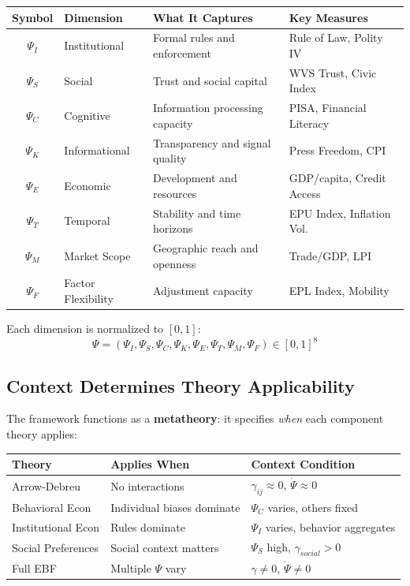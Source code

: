 \begin{center}
\renewcommand{\arraystretch}{1.3}
\begin{tabular}{@{}clll@{}}
\toprule
\textbf{Symbol} & \textbf{Dimension} & \textbf{What It Captures} & \textbf{Key Measures} \\
\midrule
$\Psi_I$ & Institutional & Formal rules and enforcement & Rule of Law, Polity IV \\
$\Psi_S$ & Social & Trust and social capital & WVS Trust, Civic Index \\
$\Psi_C$ & Cognitive & Information processing capacity & PISA, Financial Literacy \\
$\Psi_K$ & Informational & Transparency and signal quality & Press Freedom, CPI \\
$\Psi_E$ & Economic & Development and resources & GDP/capita, Credit Access \\
$\Psi_T$ & Temporal & Stability and time horizons & EPU Index, Inflation Vol. \\
$\Psi_M$ & Market Scope & Geographic reach and openness & Trade/GDP, LPI \\
$\Psi_F$ & Factor Flexibility & Adjustment capacity & EPL Index, Mobility \\
\bottomrule
\end{tabular}
\end{center}

Each dimension is normalized to $[0,1]$:
\begin{equation}
\Psi = (\Psi_I, \Psi_S, \Psi_C, \Psi_K, \Psi_E, \Psi_T, \Psi_M, \Psi_F) \in [0,1]^8
\end{equation}

\subsection{Context Determines Theory Applicability}

The framework functions as a \textbf{metatheory}: it specifies \textit{when} each
component theory applies:

\begin{center}
\renewcommand{\arraystretch}{1.3}
\begin{tabular}{lll}
\toprule
\textbf{Theory} & \textbf{Applies When} & \textbf{Context Condition} \\
\midrule
Arrow-Debreu & No interactions & $\gamma_{ij} \approx 0$, $\dot{\Psi} \approx 0$ \\
Behavioral Econ & Individual biases dominate & $\Psi_C$ varies, others fixed \\
Institutional Econ & Rules dominate & $\Psi_I$ varies, behavior aggregates \\
Social Preferences & Social context matters & $\Psi_S$ high, $\gamma_{social} > 0$ \\
Full EBF & Multiple $\Psi$ vary & $\gamma \neq 0$, $\dot{\Psi} \neq 0$ \\
\bottomrule
\end{tabular}
\end{center}

